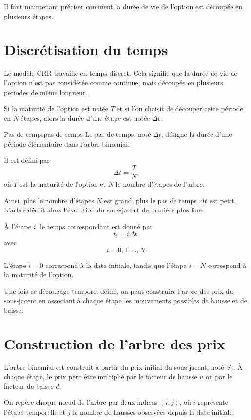 \documentclass[11pt]{report}
\begin{document}
Il faut maintenant préciser comment la durée de vie de l'option est découpée en plusieurs étapes.

\section{Discrétisation du temps}

Le modèle CRR travaille en temps discret. Cela signifie que la durée de vie de l'option n'est pas considérée comme continue, mais découpée en plusieurs périodes de même longueur.

Si la maturité de l'option est notée $T$ et si l'on choisit de découper cette période en $N$ étapes, alors la durée d'une étape est notée $\Delta t$.

\begin{definition}{Pas de temps}{pas-de-temps}
Le pas de temps, noté $\Delta t$, désigne la durée d'une période élémentaire dans l'arbre binomial.

Il est défini par
\[
\Delta t = \frac{T}{N},
\]
où $T$ est la maturité de l'option et $N$ le nombre d'étapes de l'arbre.
\end{definition}

Ainsi, plus le nombre d'étapes $N$ est grand, plus le pas de temps $\Delta t$ est petit. L'arbre décrit alors l'évolution du sous-jacent de manière plus fine.

À l'étape $i$, le temps correspondant est donné par
\[
t_i = i\Delta t,
\]
avec
\[
i = 0,1,\ldots,N.
\]

L'étape $i=0$ correspond à la date initiale, tandis que l'étape $i=N$ correspond à la maturité de l'option.

Une fois ce découpage temporel défini, on peut construire l'arbre des prix du sous-jacent en associant à chaque étape les mouvements possibles de hausse et de baisse.

\section{Construction de l'arbre des prix}

L'arbre binomial est construit à partir du prix initial du sous-jacent, noté $S_0$. À chaque étape, le prix peut être multiplié par le facteur de hausse $u$ ou par le facteur de baisse $d$.

On repère chaque nœud de l'arbre par deux indices $(i,j)$, où $i$ représente l'étape temporelle et $j$ le nombre de hausses observées depuis la date initiale.
\end{document}

